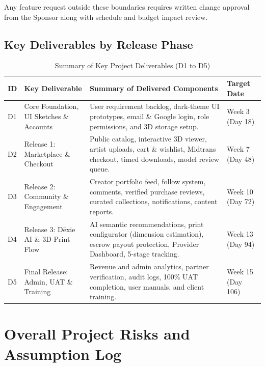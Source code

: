 \documentclass[11pt,a4paper]{article}
\newcommand{\thdr}[1]{\centering\arraybackslash\textbf{#1}}
\begin{document}
Any feature request outside these boundaries requires written change approval from the Sponsor along with schedule and budget impact review.

\subsection{Key Deliverables by Release Phase}

\begin{table}[H]
\centering
\caption{Summary of Key Project Deliverables (D1 to D5)}
\begin{tabularx}{\textwidth}{| C{1.2cm} | L{4.5cm} | Y | C{2.3cm} |}
\hline
{} \thdr{ID} & \thdr{Key Deliverable} & \thdr{Summary of Delivered Components} & \thdr{Target Date} \\
\hline
D1 & Core Foundation, UI Sketches \& Accounts & User requirement backlog, dark-theme UI prototypes, email \& Google login, role permissions, and 3D storage setup. & Week 3 (Day 18) \\
\hline
D2 & Release 1: Marketplace \& Checkout & Public catalog, interactive 3D viewer, artist uploads, cart \& wishlist, Midtrans checkout, timed downloads, model review queue. & Week 7 (Day 48) \\
\hline
D3 & Release 2: Community \& Engagement & Creator portfolio feed, follow system, comments, verified purchase reviews, curated collections, notifications, content reports. & Week 10 (Day 72) \\
\hline
D4 & Release 3: D\={e}xie AI \& 3D Print Flow & AI semantic recommendations, print configurator (dimension estimation), escrow payout protection, Provider Dashboard, 5-stage tracking. & Week 13 (Day 94) \\
\hline
D5 & Final Release: Admin, UAT \& Training & Revenue and admin analytics, partner verification, audit logs, 100\% UAT completion, user manuals, and client training. & Week 15 (Day 106) \\
\hline
\end{tabularx}
\end{table}

\clearpage
\section{Overall Project Risks and Assumption Log}
\end{document}
